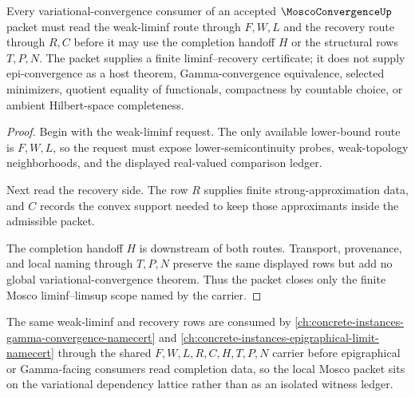 \begin{theorem}
\label{thm:mosco-convergence-liminf-limsup-scope}
Every variational-convergence consumer of an accepted $\MoscoConvergenceUp$ packet must read the weak-liminf route through $F,W,L$ and the recovery route through $R,C$ before it may use the completion handoff $H$ or the structural rows $T,P,N$. The packet supplies a finite liminf--recovery certificate; it does not supply epi-convergence as a host theorem, Gamma-convergence equivalence, selected minimizers, quotient equality of functionals, compactness by countable choice, or ambient Hilbert-space completeness.
\end{theorem}
\begin{proof}
Begin with the weak-liminf request. The only available lower-bound route is $F,W,L$, so the request must expose lower-semicontinuity probes, weak-topology neighborhoods, and the displayed real-valued comparison ledger.

Next read the recovery side. The row $R$ supplies finite strong-approximation data, and $C$ records the convex support needed to keep those approximants inside the admissible packet.

The completion handoff $H$ is downstream of both routes. Transport, provenance, and local naming through $T,P,N$ preserve the same displayed rows but add no global variational-convergence theorem. Thus the packet closes only the finite Mosco liminf--limsup scope named by the carrier.
\end{proof}

The same weak-liminf and recovery rows are consumed by \autoref{ch:concrete-instances-gamma-convergence-namecert} and \autoref{ch:concrete-instances-epigraphical-limit-namecert} through the shared $F,W,L,R,C,H,T,P,N$ carrier before epigraphical or Gamma-facing consumers read completion data, so the local Mosco packet sits on the variational dependency lattice rather than as an isolated witness ledger.

